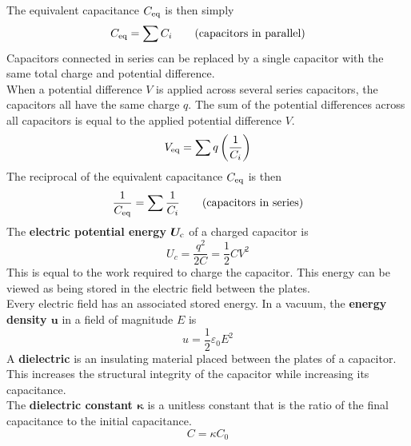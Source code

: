 \documentclass[./Electricity and Magnetism.tex]{subfiles}
\begin{document}
			The equivalent capacitance \(C_{\text{eq}}\) is then simply
			\[C_{\text{eq}} = \sum C_i \tag{capacitors in parallel}\]
		Capacitors connected in series can be replaced by a single capacitor with the same total charge and potential difference. \\
			When a potential difference \(V\) is applied across several series capacitors, the capacitors all have the same charge \(q\). The sum of the potential differences across all capacitors is equal to the applied potential difference \(V\).
			\[V_{\text{eq}} = \sum q\left(\frac{1}{C_i}\right)\]
			The reciprocal of the equivalent capacitance \(C_{\text{eq}}\) is then
			\[\frac{1}{C_{\text{eq}}} = \sum \frac{1}{C_i} \tag{capacitors in series}\]
		The \textbf{electric potential energy \(\bm{U_{\text{c}}}\)} of a charged capacitor is
			\[
				U_c = \frac{q^2}{2C}
					= \frac{1}{2}CV^2
						\tag{potential energy}
			\]
			This is equal to the work required to charge the capacitor. This energy can be viewed as being stored in the electric field between the plates. \\
			Every electric field has an associated stored energy. In a vacuum, the \textbf{energy density \(\bm{u}\)} in a field of magnitude \(E\) is
			\[u = \frac{1}{2}\varepsilon_0E^2 \tag{energy density}\]
		A \textbf{dielectric} is an insulating material placed between the plates of a capacitor. This increases the structural integrity of the capacitor while increasing its capacitance. \\
		The \textbf{dielectric constant \(\bm{\kappa}\)} is a unitless constant that is the ratio of the final capacitance to the initial capacitance.
			\[C = \kappa C_0\]
\end{document}
